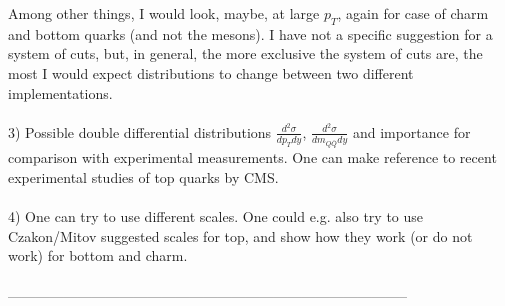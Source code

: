 \documentclass[12pt,a4paper]{article}
\begin{document}
Among other things, I would look, maybe, at large $p_T$, again for case of charm and bottom quarks (and not the mesons). 
I have not a specific suggestion for a system of cuts, but, in general, the more exclusive the system of cuts are, the most I would expect distributions to change between two different implementations. 
\\
\\
3) Possible double differential distributions $\frac{d^2\sigma}{dp_T dy}$, $\frac{d^2\sigma}{dm_{Q\bar{Q}} dy}$ and importance for comparison with experimental measurements. One can make reference to recent experimental studies of top quarks by CMS. 
\\
\\
4) One can try to use different scales. One could e.g. also try to use Czakon/Mitov suggested scales for top, and show how they work (or do not work) for bottom and charm. 
\\
\\
--------------------------------------------------------------------------------------
\end{document}
